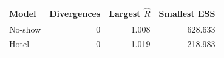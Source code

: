 \begin{tabular}{lrrr}
\toprule
Model & Divergences & Largest $\hat R$ & Smallest ESS \\
\midrule
No-show & 0 & 1.008 & 628.633 \\
Hotel & 0 & 1.019 & 218.983 \\
\bottomrule
\end{tabular}
